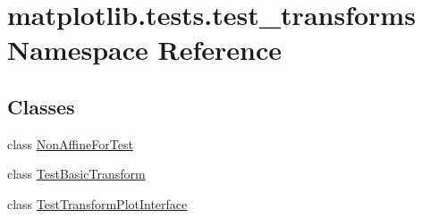 \hypertarget{namespacematplotlib_1_1tests_1_1test__transforms}{}\section{matplotlib.\+tests.\+test\+\_\+transforms Namespace Reference}
\label{namespacematplotlib_1_1tests_1_1test__transforms}
\subsection*{Classes}
\begin{DoxyCompactItemize}
\item 
class \hyperlink{classmatplotlib_1_1tests_1_1test__transforms_1_1NonAffineForTest}{Non\+Affine\+For\+Test}
\item 
class \hyperlink{classmatplotlib_1_1tests_1_1test__transforms_1_1TestBasicTransform}{Test\+Basic\+Transform}
\item 
class \hyperlink{classmatplotlib_1_1tests_1_1test__transforms_1_1TestTransformPlotInterface}{Test\+Transform\+Plot\+Interface}
\end{DoxyCompactItemize}
